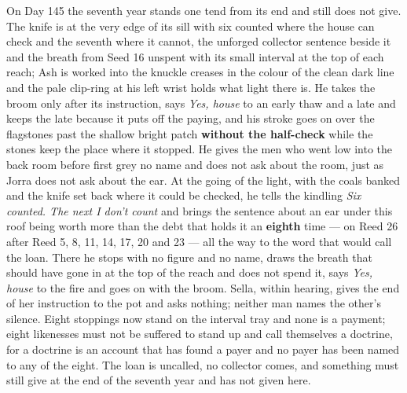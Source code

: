 \documentclass{design/chronicle}
\begin{document}
{On Day 145 the seventh year stands one tend from its end and still does not give. The knife is at the very edge of its sill with six counted where the house can check and the seventh where it cannot, the unforged collector sentence beside it and the breath from Seed 16 unspent with its small interval at the top of each reach; Ash is worked into the knuckle creases in the colour of the clean dark line and the pale clip-ring at his left wrist holds what light there is. He takes the broom only after its instruction, says \emph{Yes, house} to an early thaw and a late and keeps the late because it puts off the paying, and his stroke goes on over the flagstones past the shallow bright patch \textbf{without the half-check} while the stones keep the place where it stopped. He gives the men who went low into the back room before first grey no name and does not ask about the room, just as Jorra does not ask about the ear. At the going of the light, with the coals banked and the knife set back where it could be checked, he tells the kindling \emph{Six counted. The next I don’t count} and brings the sentence about an ear under this roof being worth more than the debt that holds it an \textbf{eighth} time — on Reed 26 after Reed 5, 8, 11, 14, 17, 20 and 23 — all the way to the word that would call the loan. There he stops with no figure and no name, draws the breath that should have gone in at the top of the reach and does not spend it, says \emph{Yes, house} to the fire and goes on with the broom. Sella, within hearing, gives the end of her instruction to the pot and asks nothing; neither man names the other’s silence. Eight stoppings now stand on the interval tray and none is a payment; eight likenesses must not be suffered to stand up and call themselves a doctrine, for a doctrine is an account that has found a payer and no payer has been named to any of the eight. The loan is uncalled, no collector comes, and something must still give at the end of the seventh year and has not given here.

}
\end{document}
